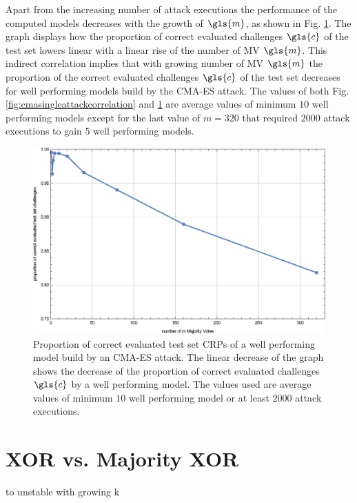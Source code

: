Apart from the increasing number of attack executions the performance of the computed models decreases with the growth of $\gls{m}$, as shown in Fig. \ref{fig:cmasingleattackcorrectness}.
The graph displays how the proportion of correct evaluated challenges $\gls{c}$ of the test set lowers linear with a linear rise of the number of \ac{MV} $\gls{m}$.
This indirect correlation implies that with growing number of \ac{MV} $\gls{m}$ the proportion of the correct evaluated challenges $\gls{c}$ of the test set decreases for well performing models build by the \ac{CMA-ES} attack.
The values of both Fig. \ref{fig:cmasingleattackcorrelation} and \ref{fig:cmasingleattackcorrectness} are average values of minimum $10$ well performing models except for the last value of $m = 320$ that required $2000$ attack executions to gain $5$ well performing models.

\begin{figure}[ht]
\includegraphics[width=1.00\textwidth]{images/single-mv-classification-cma-attack-correctness.eps}
\caption[Proportion of correct evaluated test set challenges of a model approximated by the \acs{CMA-ES} attack]{Proportion of correct evaluated test set \acp{CRP} of a well performing model build by an \ac{CMA-ES} attack. The linear decrease of the graph shows the decrease of the proportion of correct evaluated challenges $\gls{c}$ by a well performing model. The values used are average values of minimum $10$ well performing model or at least $2000$ attack executions.}
\label{fig:cmasingleattackcorrectness}
\end{figure}


\section{\acs{XOR} \apufs vs. Majority \acs{XOR} \apufs}
\label{sec:xorarbitervsmajorityxorarbiter}


\xpuf to unstable with growing k





